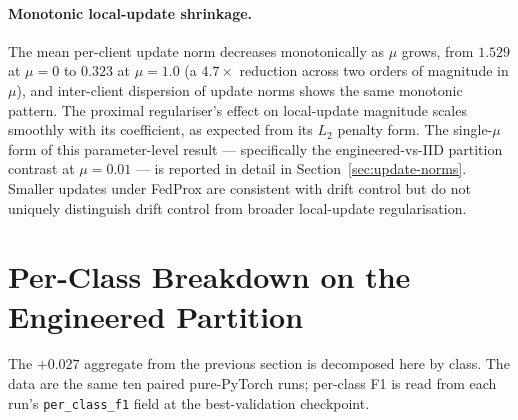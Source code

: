 \documentclass[11pt,a4paper]{report}
\begin{document}
\paragraph{Monotonic local-update shrinkage.}
The mean per-client update norm decreases monotonically as $\mu$
grows, from $1.529$ at $\mu = 0$ to $0.323$ at $\mu = 1.0$
(a $4.7\times$ reduction across two orders of magnitude in $\mu$),
and inter-client dispersion of update norms shows the same
monotonic pattern. The proximal regulariser's effect on
local-update magnitude scales smoothly with its coefficient, as
expected from its $L_2$ penalty form. The single-$\mu$ form of
this parameter-level result --- specifically the engineered-vs-IID
partition contrast at $\mu = 0.01$ --- is reported in detail in
Section~\ref{sec:update-norms}. Smaller updates under FedProx are
consistent with drift control but do not uniquely distinguish
drift control from broader local-update regularisation.

\section{Per-Class Breakdown on the Engineered Partition}
\label{sec:engineered-per-class}

The $+0.027$ aggregate from the previous section is decomposed
here by class. The data are the same ten paired pure-PyTorch
runs; per-class F1 is read from each run's
\texttt{per\_class\_f1} field at the best-validation checkpoint.
\end{document}
